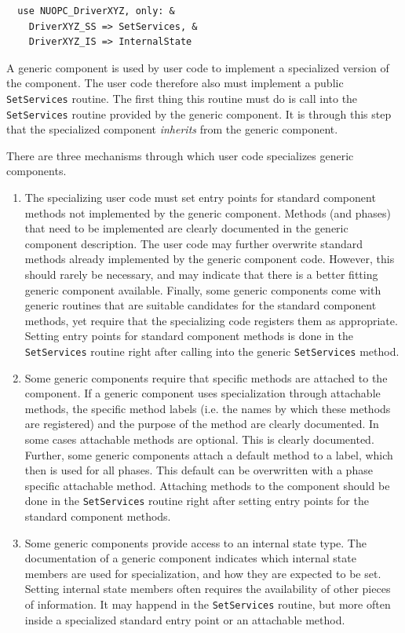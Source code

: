 \begin{verbatim}
  use NUOPC_DriverXYZ, only: &
    DriverXYZ_SS => SetServices, &
    DriverXYZ_IS => InternalState
\end{verbatim}

A generic component is used by user code to implement a specialized version of the component. The user code therefore also must implement a public {\tt SetServices} routine. The first thing this routine must do is call into the {\tt SetServices} routine provided by the generic component. It is through this step that the specialized component {\em inherits} from the generic component.

There are three mechanisms through which user code specializes generic components.

\begin{enumerate}

\item The specializing user code must set entry points for standard component methods not implemented by the generic component. Methods (and phases) that need to be implemented are clearly documented in the generic component description. The user code may further overwrite standard methods already implemented by the generic component code. However, this should rarely be necessary, and may indicate that there is a better fitting generic component available. Finally, some generic components come with generic routines that are suitable candidates for the standard component methods, yet require that the specializing code registers them as appropriate. Setting entry points for standard component methods is done in the {\tt SetServices} routine right after calling into the generic {\tt SetServices} method.

\item Some generic components require that specific methods are attached to the component. If a generic component uses specialization through attachable methods, the specific method labels (i.e. the names by which these methods are registered) and the purpose of the method are clearly documented. In some cases attachable methods are optional. This is clearly documented. Further, some generic components attach a default method to a label, which then is used for all phases. This default can be overwritten with a phase specific attachable method. Attaching methods to the component should be done in the {\tt SetServices} routine right after setting entry points for the standard component methods.

\item Some generic components provide access to an internal state type. The documentation of a generic component indicates which internal state members are used for specialization, and how they are expected to be set. Setting internal state members often requires the availability of other pieces of information. It may happend in the {\tt SetServices} routine, but more often inside a specialized standard entry point or an attachable method.

\end{enumerate}

